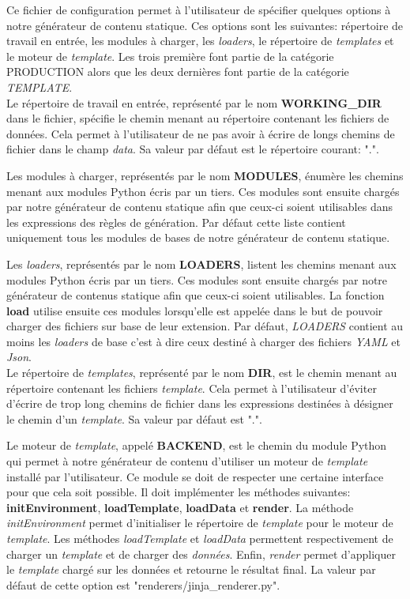 		Ce fichier de configuration permet à l'utilisateur de spécifier quelques options à notre générateur de contenu statique. Ces options sont les suivantes: répertoire de travail en entrée, les modules à charger, les \textit{loaders}, le répertoire de \textit{templates} et le moteur de \textit{template}. Les trois première font partie de la catégorie PRODUCTION alors que les deux dernières font partie de la catégorie \textit{TEMPLATE}.\\
		
		Le répertoire de travail en entrée, représenté par le nom \textbf{WORKING\_DIR} dans le fichier, spécifie le chemin menant au répertoire contenant les fichiers de données. Cela permet à l'utilisateur de ne pas avoir à écrire de longs chemins de fichier dans le champ \textit{data}. Sa valeur par défaut est le répertoire courant: ".".
		
		Les modules à charger, représentés par le nom \textbf{MODULES}, énumère les chemins menant aux modules Python écris par un tiers. Ces modules sont ensuite chargés par notre générateur de contenu statique afin que ceux-ci soient utilisables dans les expressions des règles de génération. Par défaut cette liste contient uniquement tous les modules de bases de notre générateur de contenu statique.
		
		Les \textit{loaders}, représentés par le nom \textbf{LOADERS}, listent les chemins menant aux modules Python écris par un tiers. Ces modules sont ensuite chargés par notre générateur de contenus statique afin que ceux-ci soient utilisables. La fonction \textbf{load} utilise ensuite ces modules lorsqu'elle est appelée dans le but de pouvoir charger des fichiers sur base de leur extension. Par défaut, \textit{LOADERS} contient au moins les \textit{loaders} de base c'est à dire ceux destiné à charger des fichiers \textit{YAML} et \textit{Json}.\\
		
		Le répertoire de \textit{templates}, représenté par le nom \textbf{DIR}, est le chemin menant au répertoire contenant les fichiers \textit{template}. Cela permet à l'utilisateur d'éviter d'écrire de trop long chemins de fichier dans les expressions destinées à désigner le chemin d'un \textit{template}. Sa valeur par défaut est ".".
		
		Le moteur de \textit{template}, appelé \textbf{BACKEND}, est le chemin du module Python qui permet à notre générateur de contenu d'utiliser un moteur de \textit{template} installé par l'utilisateur. Ce module se doit de respecter une certaine interface pour que cela soit possible. Il doit implémenter les méthodes suivantes: \textbf{initEnvironment}, \textbf{loadTemplate}, \textbf{loadData} et \textbf{render}. La méthode \textit{initEnvironment} permet d'initialiser le répertoire de \textit{template} pour le moteur de \textit{template}. Les méthodes \textit{loadTemplate} et \textit{loadData} permettent respectivement de charger un \textit{template} et de charger des \textit{données}. Enfin, \textit{render} permet d'appliquer le \textit{template} chargé sur les données et retourne le résultat final. La valeur par défaut de cette option est "renderers/jinja\_renderer.py".\\
		
